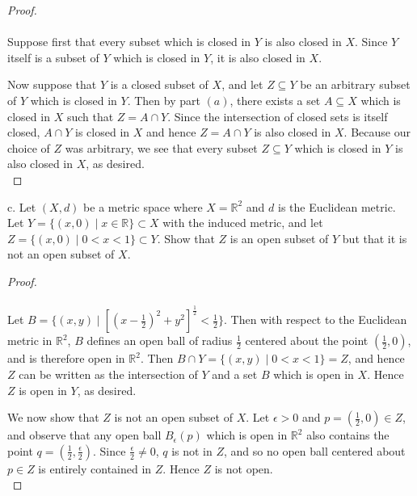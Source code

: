 \begin{proof}\ \\\\
    Suppose first that every subset which is closed in $Y$ is also closed in $X$. Since $Y$ itself is a subset of $Y$ 
    which is closed in $Y$, it is also closed in $X$.

    Now suppose that $Y$ is a closed subset of $X$, and let $Z \subseteq Y$ be an arbitrary subset of $Y$ which is 
    closed in $Y$. Then by part $(a)$, there exists a set $A \subseteq X$ which is closed in $X$ such that 
    $Z = A \cap Y$. Since the intersection of closed sets is itself closed, $A \cap Y$ is closed in $X$
    and hence $Z = A \cap Y$ is also closed in $X$. Because our choice of $Z$ was arbitrary, we see that every
    subset $Z \subseteq Y$ which is closed in $Y$ is also closed in $X$, as desired.
    \ \\
\end{proof}

\pagebreak
c.  Let $(X, d)$ be a metric space where $X = \mathbb{R}^2$ and $d$ is the Euclidean metric. Let 
    $Y = \{(x, 0) \mid x \in \mathbb{R} \} \subset X$ with the induced metric, and let 
    $Z = \{(x, 0) \mid 0 < x < 1 \} \subset Y$. Show that $Z$ is an open subset of $Y$ but that it is not an open subset
    of $X$.

\begin{proof}\ \\\\
    Let $B = \{(x, y) \mid [(x - \frac{1}{2})^2 + y^2 ]^{\frac{1}{2}} < \frac{1}{2} \}$. Then with respect to
    the Euclidean metric in $\mathbb{R}^2$, $B$ defines an open ball of radius $\frac{1}{2}$ centered about the point 
    $(\frac{1}{2}, 0)$, and is therefore open in $\mathbb{R}^2$. Then $B \cap Y = \{ (x, y) \mid 0 < x < 1 \} = Z$, and 
    hence $Z$ can be written as the intersection of $Y$ and a set $B$ which is open in $X$. Hence $Z$ is open in $Y$,
    as desired.

    We now show that $Z$ is not an open subset of $X$. Let $\epsilon > 0$ and $p = \left( \frac{1}{2}, 0 \right) \in Z$,
    and observe that any open ball $B_\epsilon(p)$ which is open in $\mathbb{R}^2$ also contains the point 
    $q = (\frac{1}{2}, \frac{\epsilon}{2})$. Since $\frac{\epsilon}{2} \neq 0$, $q$ is not in $Z$, and so no open ball
    centered about $p \in Z$ is entirely contained in $Z$. Hence $Z$ is not open.
    \ \\
\end{proof}

\pagebreak